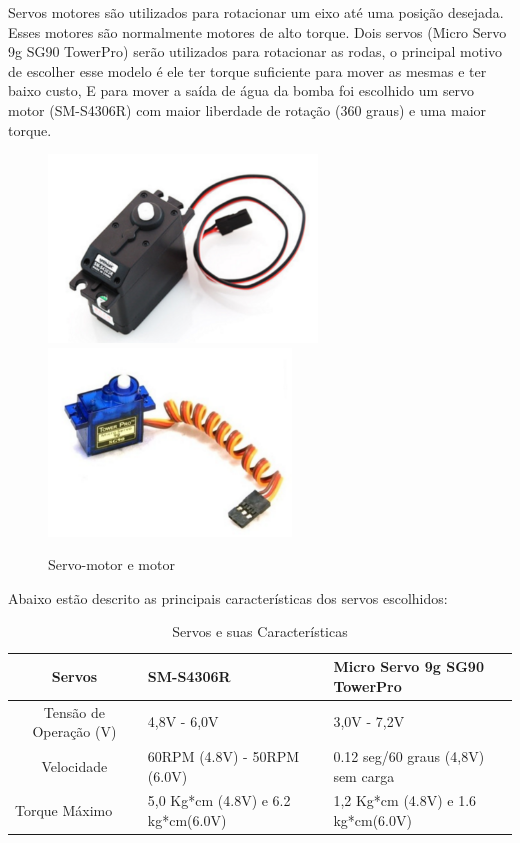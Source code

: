 Servos motores são utilizados para rotacionar um eixo até uma posição desejada. Esses motores são normalmente motores de alto torque. Dois servos (Micro Servo 9g SG90 TowerPro) serão utilizados para rotacionar as rodas, o principal motivo de escolher esse modelo é ele ter torque suficiente para mover as mesmas e ter baixo custo, E para mover a saída de água da bomba foi escolhido um servo motor (SM-S4306R) com maior liberdade de rotação (360 graus) e uma maior torque.

\begin{figure}[h]
  \centering
	\includegraphics[height=5cm]{figuras/servant-motor.png}
	\quad
	\includegraphics[height=5cm]{figuras/micro-motor.png}
  \caption{Servo-motor e motor}
  \label{fig:plastic-wheel-base}
\end{figure}
\FloatBarrier

Abaixo estão descrito as principais características dos servos escolhidos:


\begin{table}[h]
\centering
\caption{Servos e suas Características}
\label{char-servo}
\begin{tabular}{@{}cll@{}}
\toprule
\textbf{Servos}                   & SM-S4306R                          & Micro Servo 9g SG90 TowerPro       \\ \midrule
Tensão de Operação (V)            & 4,8V - 6,0V                        & 3,0V - 7,2V                        \\
Velocidade                        & 60RPM (4.8V) - 50RPM (6.0V)        & 0.12 seg/60 graus (4,8V) sem carga \\
\multicolumn{1}{l}{Torque Máximo} & 5,0 Kg*cm (4.8V) e 6.2 kg*cm(6.0V) & 1,2 Kg*cm (4.8V) e 1.6 kg*cm(6.0V) \\ \bottomrule
\end{tabular}
\end{table}

